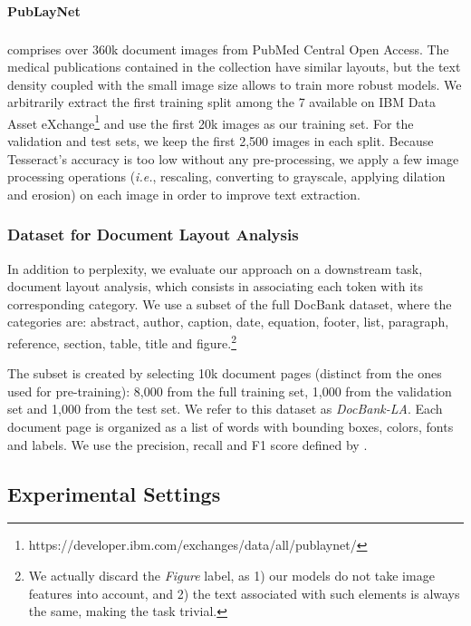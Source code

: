 \paragraph{PubLayNet} \citep{zhong2019publaynet} comprises over 360k document images from PubMed Central\textsuperscript{\texttrademark} Open Access. The medical publications contained in the collection have similar layouts, but the text density coupled with the small image size allows to train more robust models. We arbitrarily extract the first training split among the 7 available on IBM Data Asset eXchange\footnote{https://developer.ibm.com/exchanges/data/all/publaynet/} and use the first 20k images as our training set. For the validation and test sets, we keep the first 2,500 images in each split. Because Tesseract's accuracy is too low without any pre-processing, we apply a few image processing operations (\textit{i.e.}, rescaling, converting to grayscale, applying dilation and erosion) on each image in order to improve text extraction.

\subsubsection{Dataset for Document Layout Analysis}

In addition to perplexity, we evaluate our approach on a downstream task, document layout analysis, which consists in associating each token with its corresponding category. We use a subset of the full DocBank dataset, where the categories are: abstract, author, caption, date, equation, footer, list, paragraph, reference, section, table, title and figure.\footnote{We actually discard the \textit{Figure} label, as 1) our models do not take image features into account, and 2) the text associated with such elements is always the same, making the task trivial.}

The subset is created by selecting 10k document pages (distinct from the ones used for pre-training): 8,000 from the full training set, 1,000 from the validation set and 1,000 from the test set. We refer to this dataset as \textit{DocBank-LA}. Each document page is organized as a list of words with bounding boxes, colors, fonts and labels. We use the precision, recall and F1 score defined by \citet{li2020docbank}.

\subsection{Experimental Settings}

